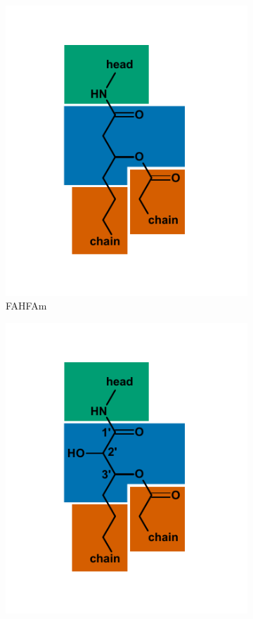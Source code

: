 {\begin{figure}[h]
\begin{subfigure}[b]{.45\linewidth}
    	\includegraphics[width=\linewidth]{figs_ch1/FAHFAm}
    	\caption{FAHFAm}
        \label{fig:FAHFAm}
    \end{subfigure}
    \begin{subfigure}[b]{.45\linewidth}
        \includegraphics[width=\linewidth]{figs_ch1/FAHFAm-OH}

\end{subfigure}
\end{figure}}
